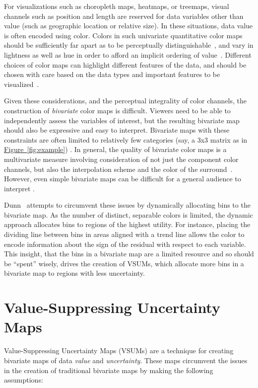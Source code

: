\documentclass{vgtc}                          %
\newcommand{\figref}[1]{\hyperref[#1]{Figure~\ref*{#1}}}
\begin{document}
For visualizations such as choropleth maps, heatmaps, or treemaps, visual channels such as position and length are reserved for data variables other than value (such as geographic location or relative size). In these situations, data value is often encoded using color. Colors in such univariate quantitative color maps should be sufficiently far apart as to be perceptually distinguishable~\cite{ware1988color}, and vary in lightness as well as hue in order to afford an implicit ordering of value~\cite{borland2007rainbow,rogowitz2001blair}. Different choices of color maps can highlight different features of the data, and should be chosen with care based on the data types and important features to be visualized~\cite{rogowitz1996not}.

Given these considerations, and the perceptual integrality of color channels, the construction of \emph{bivariate} color maps is difficult. Viewers need to be able to independently assess the variables of interest, but the resulting bivariate map should also be expressive and easy to interpret. Bivariate maps with these constraints are often limited to relatively few categories (say, a 3x3 matrix as in \figref{fig:example}) \cite{robertson1986generation,trumbo1981theory}. In general, the quality of bivariate color maps is a multivariate measure involving consideration of not just the component color channels, but also the interpolation scheme and the color of the surround~\cite{bernard2015survey}. However, even simple bivariate maps can be difficult for a general audience to interpret \cite{wainer1980empirical}.

Dunn~\cite{dunn1989dynamic} attempts to circumvent these issues by dynamically allocating bins to the bivariate map. As the number of distinct, separable colors is limited, the dynamic approach allocates bins to regions of the highest utility. For instance, placing the dividing line between bins in areas aligned with a trend line allows the color to encode information about the sign of the residual with respect to each variable. This insight, that the bins in a bivariate map are a limited resource and so should be ``spent'' wisely, drives the creation of VSUMs, which allocate more bins in a bivariate map to regions with less uncertainty.

\section{Value-Suppressing Uncertainty Maps}

Value-Suppressing Uncertainty Maps (VSUMs) are a technique for creating bivariate maps of data \emph{value} and \emph{uncertainty}. These maps circumvent the issues in the creation of traditional bivariate maps by making the following assumptions:
\end{document}
